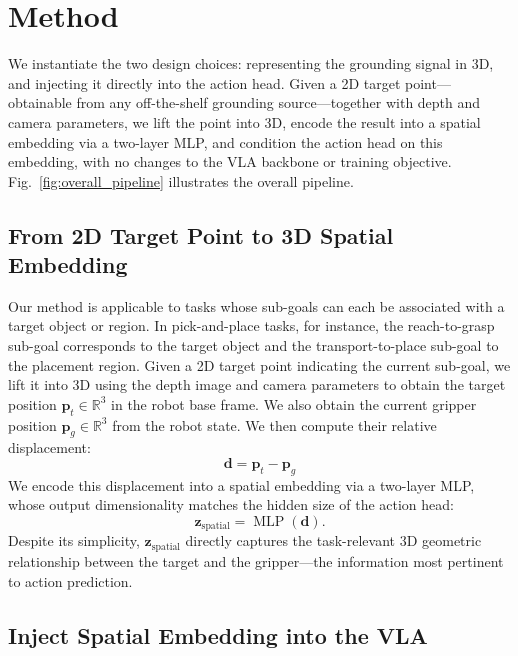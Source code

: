\section{Method}

We instantiate the two design choices: representing the grounding signal in 3D, and injecting it directly into the action head. Given a 2D target point—obtainable from any off-the-shelf grounding source—together with depth and camera parameters, we lift the point into 3D, encode the result into a spatial embedding via a two-layer MLP, and condition the action head on this embedding, with no changes to the VLA backbone or training objective. Fig.~\ref{fig:overall_pipeline} illustrates the overall pipeline.
 
\subsection{From 2D Target Point to 3D Spatial Embedding}
Our method is applicable to tasks whose sub-goals can each be associated with a target object or region. In pick-and-place tasks, for instance, the reach-to-grasp sub-goal corresponds to the target object and the transport-to-place sub-goal to the placement region. Given a 2D target point indicating the current sub-goal, we lift it into 3D using the depth image and camera parameters to obtain the target position $\mathbf{p}_t \in \mathbb{R}^3$ in the robot base frame. We also obtain the current gripper position $\mathbf{p}_g \in \mathbb{R}^3$ from the robot state. We then compute their relative displacement:
\begin{equation}
    \mathbf{d} = \mathbf{p}_t - \mathbf{p}_g
\end{equation}
We encode this displacement into a spatial embedding via a two-layer MLP, whose output dimensionality matches the hidden size of the action head:
\begin{equation}
    \mathbf{z}_{\text{spatial}} = \operatorname{MLP}(\mathbf{d}).
\end{equation}
Despite its simplicity, $\mathbf{z}_\text{spatial}$ directly captures the task-relevant 3D geometric relationship between the target and the gripper---the information most pertinent to action prediction.
 
\subsection{Inject Spatial Embedding into the VLA}
 
